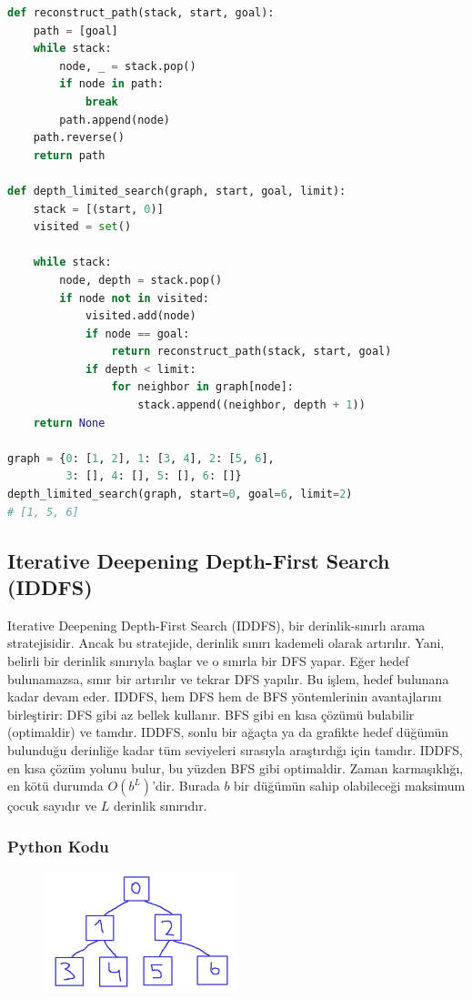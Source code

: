 \begin{lstlisting}[language=Python]
def reconstruct_path(stack, start, goal):
    path = [goal]
    while stack:
        node, _ = stack.pop()
        if node in path:
            break
        path.append(node)
    path.reverse()
    return path

def depth_limited_search(graph, start, goal, limit):
    stack = [(start, 0)]
    visited = set()

    while stack:
        node, depth = stack.pop()
        if node not in visited:
            visited.add(node)
            if node == goal:
                return reconstruct_path(stack, start, goal)
            if depth < limit:
                for neighbor in graph[node]:
                    stack.append((neighbor, depth + 1))
    return None

graph = {0: [1, 2], 1: [3, 4], 2: [5, 6], 
         3: [], 4: [], 5: [], 6: []}
depth_limited_search(graph, start=0, goal=6, limit=2)
# [1, 5, 6]
\end{lstlisting}

\newpage

\subsection{Iterative Deepening Depth-First Search (IDDFS)}

Iterative Deepening Depth-First Search (IDDFS), bir derinlik-sınırlı arama stratejisidir. Ancak bu stratejide, derinlik sınırı kademeli olarak artırılır. Yani, belirli bir derinlik sınırıyla başlar ve o sınırla bir DFS yapar. Eğer hedef bulunamazsa, sınır bir artırılır ve tekrar DFS yapılır. Bu işlem, hedef bulunana kadar devam eder. IDDFS, hem DFS hem de BFS yöntemlerinin avantajlarını birleştirir: DFS gibi az bellek kullanır. BFS gibi en kısa çözümü bulabilir (optimaldir) ve tamdır. IDDFS, sonlu bir ağaçta ya da grafikte hedef düğümün bulunduğu derinliğe kadar tüm seviyeleri sırasıyla araştırdığı için tamdır. IDDFS, en kısa çözüm yolunu bulur, bu yüzden BFS gibi optimaldir. Zaman karmaşıklığı, en kötü durumda $O(b^L)$'dir. Burada $b$ bir düğümün sahip olabileceği maksimum çocuk sayıdır ve $L$ derinlik sınırıdır.

\subsubsection{Python Kodu}

\begin{figure}[h]
    \centering
    \includegraphics[width=0.5\textwidth]{images/iddfs.png}
    \caption{}
\end{figure}

